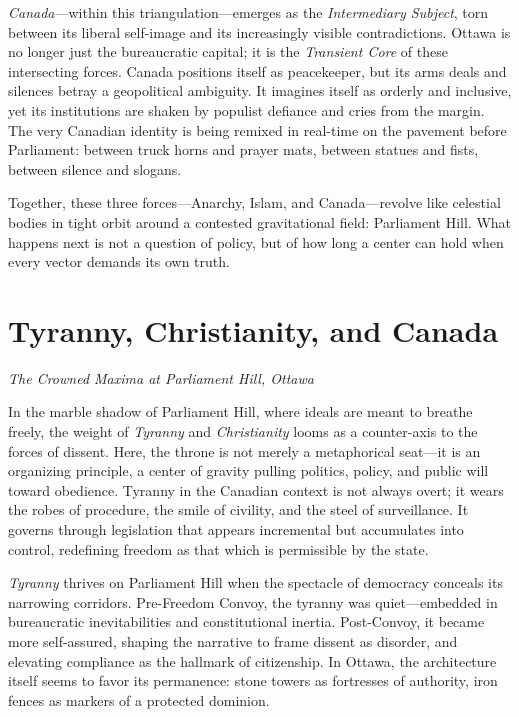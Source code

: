 \documentclass[12pt]{article}
\begin{document}
\begin{multicols}{2}
\textit{Canada}—within this triangulation—emerges as the \textit{Intermediary Subject}, torn between its liberal self-image and its increasingly visible contradictions. Ottawa is no longer just the bureaucratic capital; it is the \textit{Transient Core} of these intersecting forces. Canada positions itself as peacekeeper, but its arms deals and silences betray a geopolitical ambiguity. It imagines itself as orderly and inclusive, yet its institutions are shaken by populist defiance and cries from the margin. The very Canadian identity is being remixed in real-time on the pavement before Parliament: between truck horns and prayer mats, between statues and fists, between silence and slogans.

Together, these three forces—Anarchy, Islam, and Canada—revolve like celestial bodies in tight orbit around a contested gravitational field: Parliament Hill. What happens next is not a question of policy, but of how long a center can hold when every vector demands its own truth.

\columnbreak

\section*{Tyranny, Christianity, and Canada}
\noindent\textit{The Crowned Maxima at Parliament Hill, Ottawa}

In the marble shadow of Parliament Hill, where ideals are meant to breathe freely, the weight of \textit{Tyranny} and \textit{Christianity} looms as a counter-axis to the forces of dissent. Here, the throne is not merely a metaphorical seat—it is an organizing principle, a center of gravity pulling politics, policy, and public will toward obedience. Tyranny in the Canadian context is not always overt; it wears the robes of procedure, the smile of civility, and the steel of surveillance. It governs through legislation that appears incremental but accumulates into control, redefining freedom as that which is permissible by the state.

\textit{Tyranny} thrives on Parliament Hill when the spectacle of democracy conceals its narrowing corridors. Pre-Freedom Convoy, the tyranny was quiet—embedded in bureaucratic inevitabilities and constitutional inertia. Post-Convoy, it became more self-assured, shaping the narrative to frame dissent as disorder, and elevating compliance as the hallmark of citizenship. In Ottawa, the architecture itself seems to favor its permanence: stone towers as fortresses of authority, iron fences as markers of a protected dominion.


\end{multicols}
\end{document}
